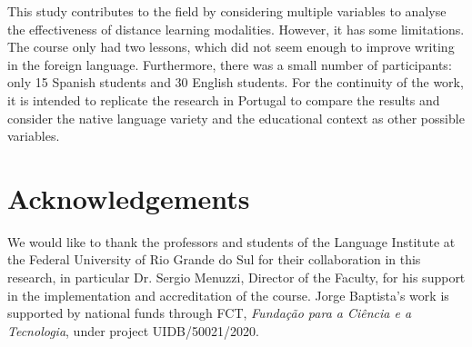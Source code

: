 \documentclass{textolivre}
\begin{document}
This study contributes to the field by considering multiple variables to
analyse the effectiveness of distance learning modalities. However, it
has some limitations. The course only had two lessons, which did not
seem enough to improve writing in the foreign language. Furthermore,
there was a small number of participants: only 15 Spanish students and
30 English students. For the continuity of the work, it is intended to
replicate the research in Portugal to compare the results and consider
the native language variety and the educational context as other
possible variables.

\section*{Acknowledgements}
We would like to thank the professors and students of the Language
Institute at the Federal University of Rio Grande do Sul for their
collaboration in this research, in particular Dr. Sergio Menuzzi,
Director of the Faculty, for his support in the implementation and
accreditation of the course.
Jorge Baptista’s work is supported by national funds through FCT, \textit{Fundação para
a Ciência e a Tecnologia}, under project UIDB/50021/2020.

\printbibliography\label{sec-bib}
\end{document}
